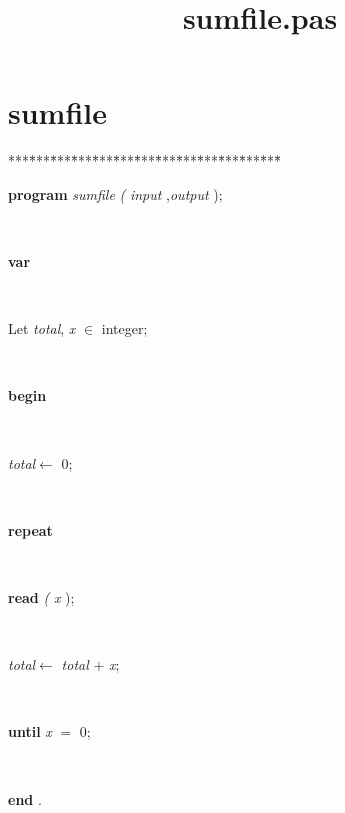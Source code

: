 \documentclass[10pt, a4paper]{article}
\title{sumfile.pas}
\begin{document}
\maketitle

\tableofcontents
\section{sumfile}
\begin{tabbing}
***\=***\=***\=***\=***\=***\=***\=***\=***\=***\=***\=***\=***\=\kill
\parbox{14cm}{\textsf{\textbf{program}  \textit{sumfile} \textit{(} \textit{input} ,\textit{output} );}}\\
\+\parbox{14cm}{\textsf{\textbf{var} }}\\
\parbox{14cm}{\textsf{Let \textit{total}, \textit{x} $\in$ integer;}}\\
\-\<\+\parbox{14cm}{\textsf{\textbf{begin} }}\\
\parbox{14cm}{\textsf{\textit{total}$\leftarrow$ 0}; }\\
\+\parbox{14cm}{\textsf{\textbf{repeat} }}\\
\parbox{14cm}{\textsf{\textbf{read} \textit{(} \textit{x} );}}\\
\parbox{14cm}{\textsf{\textit{total}$\leftarrow$ \textit{total} + \textit{x}}; }\\
\-\<\parbox{14cm}{\textsf {\textbf {until } \textsf{\textit{x} $=$ 0}; }}\\
\<\-\parbox{14cm}{\textsf{\textbf{end} .}}\\
\end{tabbing}
\end{document}
